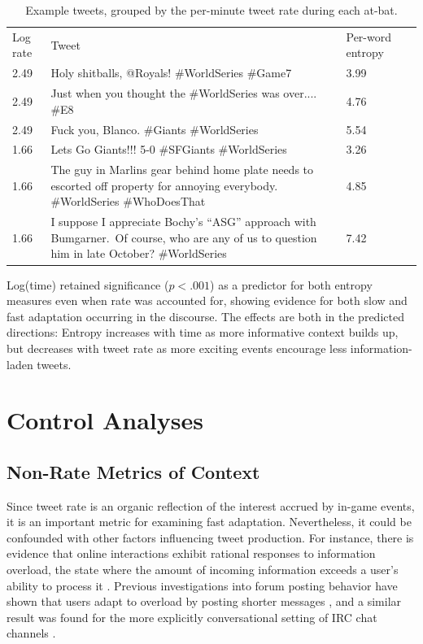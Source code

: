 \documentclass[11pt,letterpaper]{article}
\begin{document}
\begin{table}[ht]
  \begin{tabular}{M{.5in}L{4.5in}M{1.1in}M{.01in}}
Log rate & Tweet & Per-word entropy \\
2.49 & Holy shitballs, @Royals! \#WorldSeries \#Game7 & 3.99&\\[4pt]
2.49 & Just when you thought the \#WorldSeries was over.... \#E8 & 4.76&\\[4pt]
2.49 & Fuck you, Blanco. \#Giants \#WorldSeries & 5.54&\\[4pt]
1.66 & Lets Go Giants!!! 5-0  \#SFGiants \#WorldSeries & 3.26&\\[6pt]
1.66 & \parbox[][6ex][c]{.7\textwidth}{The guy in Marlins gear behind home plate needs to escorted off property for annoying everybody. \#WorldSeries \#WhoDoesThat} & 4.85&\\[18pt]
1.66 & \parbox[][6ex][c]{.7\textwidth}{I suppose I appreciate Bochy's ``ASG'' approach with Bumgarner.~Of course, who are any of us to question him in late October? \#WorldSeries} & 7.42&\\[18pt]
  \end{tabular}
 \caption{Example tweets, grouped by the per-minute tweet rate during each at-bat.}\label{tab:ex2}
\end{table}

Log(time) retained significance ($p<.001$) as a predictor for both entropy measures even when rate was accounted for, showing evidence for both slow and fast adaptation occurring in the discourse.  The effects are both in the predicted directions: Entropy increases with time as more informative context builds up, but decreases with tweet rate as more exciting events encourage less information-laden tweets.

\section{Control Analyses}

\subsection{Non-Rate Metrics of Context}\label{sect:other-metrics}

Since tweet rate is an organic reflection of the interest accrued by in-game events, it is an important metric for examining fast adaptation. Nevertheless, it could be confounded with other factors influencing tweet production.  For instance, there is evidence that online interactions exhibit rational responses to information overload, the state where the amount of incoming information exceeds a user's ability to process it \cite{miller1956,schoberth2003}.  Previous investigations into forum posting behavior have shown that users adapt to overload by posting shorter messages \cite{jones2001a,jones2001b,whittaker2003,schoberth2003}, and a similar result was found for the more explicitly conversational setting of IRC chat channels \cite{jones2008}.   
\end{document}
